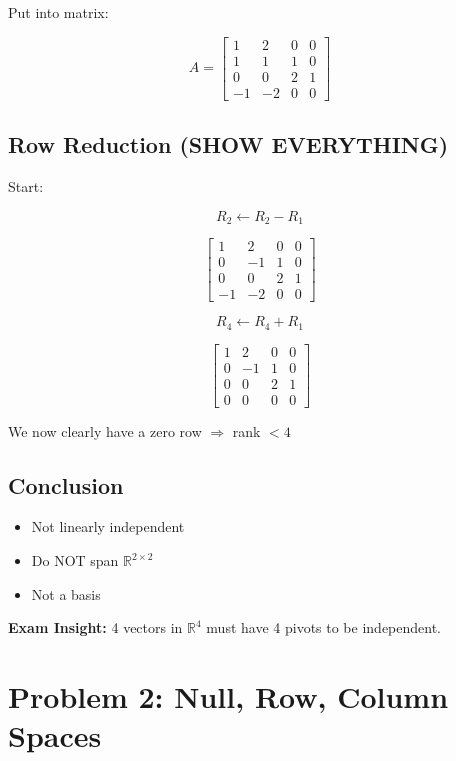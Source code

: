 \documentclass[11pt]{article}
\begin{document}
Put into matrix:

\[
A =
\begin{bmatrix}
1 & 2 & 0 & 0 \\
1 & 1 & 1 & 0 \\
0 & 0 & 2 & 1 \\
-1 & -2 & 0 & 0
\end{bmatrix}
\]

\subsection*{Row Reduction (SHOW EVERYTHING)}

Start:

\[
R_2 \leftarrow R_2 - R_1
\]

\[
\begin{bmatrix}
1 & 2 & 0 & 0 \\
0 & -1 & 1 & 0 \\
0 & 0 & 2 & 1 \\
-1 & -2 & 0 & 0
\end{bmatrix}
\]

\[
R_4 \leftarrow R_4 + R_1
\]

\[
\begin{bmatrix}
1 & 2 & 0 & 0 \\
0 & -1 & 1 & 0 \\
0 & 0 & 2 & 1 \\
0 & 0 & 0 & 0
\end{bmatrix}
\]

We now clearly have a zero row $\Rightarrow$ rank $< 4$

\subsection*{Conclusion}

\begin{itemize}
    \item Not linearly independent
    \item Do NOT span $\mathbb{R}^{2\times2}$
    \item Not a basis
\end{itemize}

\textbf{Exam Insight:}
4 vectors in $\mathbb{R}^4$ must have 4 pivots to be independent.

\hrulefill

\section*{Problem 2: Null, Row, Column Spaces}
\end{document}
